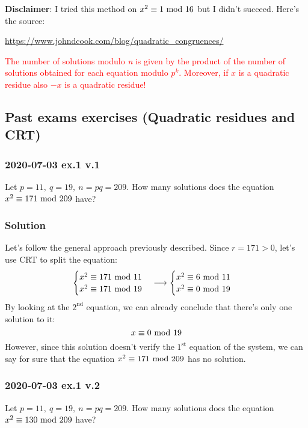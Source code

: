 \begin{itemize}
\begin{itemize}
\begin{itemize}
            \textbf{Disclaimer}: I tried this method on $x^2\equiv1\text{ mod }16$ but I didn't succeed. Here's the source:
            \begin{center}
                \textcolor{blue}{\url{https://www.johndcook.com/blog/quadratic_congruences/}}
            \end{center}
        \end{itemize}
    \end{itemize}
    \textcolor{red}{The number of solutions modulo \textit{n} is given by the product of the number of solutions obtained for each equation modulo $p^k$. Moreover, if $x$ is a quadratic residue also $-x$ is a quadratic residue!}
\end{itemize}

\newpage
\subsection{Past exams exercises (Quadratic residues and CRT)}
\subsubsection{2020-07-03 ex.1 v.1}
Let $p=11,\ q=19,\ n=pq=209$. How many solutions does the equation $x^2\equiv171\text{ mod }209$ have?
\subsubsection*{Solution}
Let's follow the general approach previously described. Since $r=171>0$, let's use CRT to split the equation:
\begin{equation*}
    \begin{cases}
        x^2\equiv171\text{ mod }11\\
        x^2\equiv171\text{ mod }19
    \end{cases}\longrightarrow
    \begin{cases}
        x^2\equiv6\text{ mod }11\\
        x^2\equiv0\text{ mod }19
    \end{cases}
\end{equation*}
By looking at the $2^{\text{nd}}$ equation, we can already conclude that there's only one solution to it:
$$x\equiv0\text{ mod }19$$
However, since this solution doesn't verify the $1^{\text{st}}$ equation of the system, we can say for sure that the equation $x^2\equiv171\text{ mod }209$ has no solution.

\subsubsection{2020-07-03 ex.1 v.2}
Let $p=11,\ q=19,\ n=pq=209$. How many solutions does the equation $x^2\equiv130\text{ mod }209$ have?
